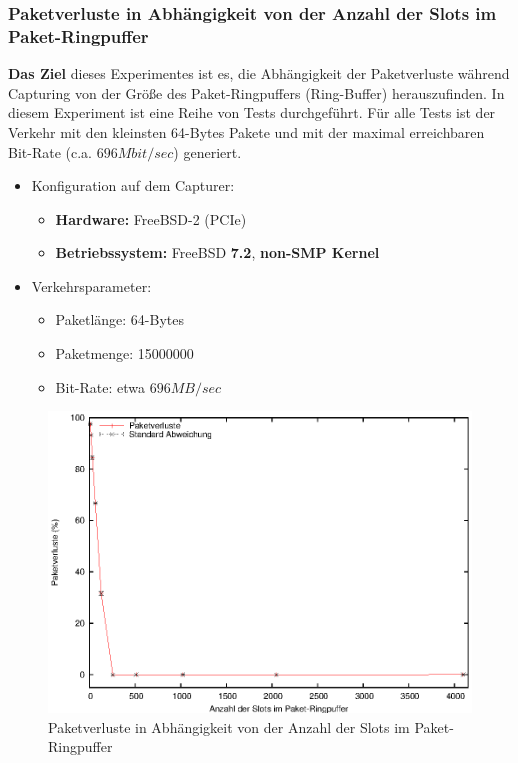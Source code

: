 \subsubsection*{Paketverluste in Abhängigkeit von der Anzahl der Slots im  Paket-Ringpuffer}
\textbf{Das Ziel} dieses Experimentes ist es, die Abhängigkeit der Paketverluste
während Capturing von der Größe des Paket-Ringpuffers (Ring-Buffer)
herauszufinden. In diesem Experiment ist eine Reihe von Tests durchgeführt. Für
alle Tests ist der Verkehr mit den kleinsten 64-Bytes Pakete und mit der maximal
erreichbaren Bit-Rate (c.a. $696Mbit/sec$) generiert.
%
\begin{itemize}
\item Konfiguration auf dem Capturer: 
\begin{itemize}
	\item \textbf{Hardware:} FreeBSD-2 (PCIe)
	\item \textbf{Betriebssystem:} FreeBSD \textbf{7.2}, \textbf{non-SMP Kernel}
\end{itemize}
\item Verkehrsparameter:
\begin{itemize}
	\item Paketlänge: 64-Bytes
	\item Paketmenge: 15000000
	\item Bit-Rate: etwa $696MB/sec$
\end{itemize}
\end{itemize}
\begin{figure} 
\centering \includegraphics[width=5.5in]{plots/graphs/pktlos_single_bufsize.eps}
\caption{Paketverluste in Abhängigkeit von der Anzahl der Slots im Paket-Ringpuffer}
\label{img:plot_pktlos_puffs}
\end{figure}
%
% 
